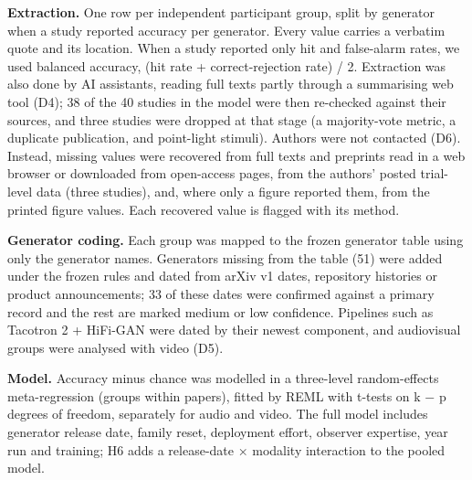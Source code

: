 \documentclass[11pt]{article}
\begin{document}
\textbf{Extraction.} One row per independent participant group, split by
generator when a study reported accuracy per generator. Every value
carries a verbatim quote and its location. When a study reported only
hit and false-alarm rates, we used balanced accuracy, (hit rate +
correct-rejection rate) / 2. Extraction was also done by AI assistants,
reading full texts partly through a summarising web tool (D4); 38 of the
40 studies in the model were then re-checked against their sources, and
three studies were dropped at that stage (a majority-vote metric, a
duplicate publication, and point-light stimuli). Authors were not
contacted (D6). Instead, missing values were recovered from full texts
and preprints read in a web browser or downloaded from open-access
pages, from the authors' posted trial-level data (three studies), and,
where only a figure reported them, from the printed figure values. Each
recovered value is flagged with its method.

\textbf{Generator coding.} Each group was mapped to the frozen generator
table using only the generator names. Generators missing from the table
(51) were added under the frozen rules and dated from arXiv v1 dates,
repository histories or product announcements; 33 of these dates were
confirmed against a primary record and the rest are marked medium or low
confidence. Pipelines such as Tacotron 2 + HiFi-GAN were dated by their
newest component, and audiovisual groups were analysed with video (D5).

\textbf{Model.} Accuracy minus chance was modelled in a three-level
random-effects meta-regression (groups within papers), fitted by REML
with t-tests on k − p degrees of freedom, separately for audio and
video. The full model includes generator release date, family reset,
deployment effort, observer expertise, year run and training; H6 adds a
release-date × modality interaction to the pooled model.
\end{document}
